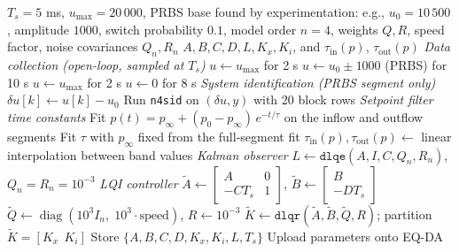 \documentclass[12pt,a4paper]{article}
\begin{document}
\begin{algorithm}[ht]
\caption{Prior to implementation (offline) using open-loop identification}\label{alg:offline}
\begin{algorithmic}[1]
\Require $T_s = 5$ ms, $u_{\max} = 20\,000$, PRBS base found by experimentation: e.g., $u_0 = 10\,500$,
         amplitude $1000$, switch probability $0.1$, model order $n = 4$,
         weights $Q, R$, speed factor, noise covariances $Q_n, R_n$
\Ensure $A, B, C, D, L, K_x, K_i$, and $\tau_{\text{in}}(p)$, $\tau_{\text{out}}(p)$
  \Statex \textit{Data collection (open-loop, sampled at $T_s$)}
  \State $u \gets u_{\max}$ for 2 s 
  \State $u \gets u_0 \pm 1000$ (PRBS) for 10 s 
  \State $u \gets u_{\max}$ for 2 s 
  \State $u \gets 0$ for 8 s 
  \Statex \textit{System identification (PRBS segment only)}
  \State $\delta u[k] \gets u[k] - u_0$
  \State Run \texttt{n4sid} on $(\delta u, y)$ with 20 block rows
  \Statex \textit{Setpoint filter time constants}
  \State Fit $p(t) = p_\infty + (p_0 - p_\infty)\,e^{-t/\tau}$ on the inflow
         and outflow segments
    \State Fit $\tau$ with $p_\infty$ fixed from the full-segment fit
  \EndFor
  \State $\tau_{\text{in}}(p), \tau_{\text{out}}(p) \gets$ linear interpolation
         between band values
  \Statex \textit{Kalman observer}
  \State $L \gets \texttt{dlqe}(A, I, C, Q_n, R_n)$, \quad $Q_n = R_n = 10^{-3}$
  \Statex \textit{LQI controller}
  \State $\tilde{A} \gets \begin{bmatrix} A & 0 \\ -C T_s & 1 \end{bmatrix}$,
         \quad $\tilde{B} \gets \begin{bmatrix} B \\ -D T_s \end{bmatrix}$
  \State $\tilde{Q} \gets \operatorname{diag}(10^{3} I_n,\; 10^{3}\cdot\text{speed})$, \quad $R \gets 10^{-3}$
  \State $\tilde{K} \gets \texttt{dlqr}(\tilde{A}, \tilde{B}, \tilde{Q}, R)$;
         \quad partition $\tilde{K} = [K_x \;\, K_i]$
  \State Store $\{A, B, C, D, K_x, K_i, L, T_s\}$
  \State Upload parameters onto EQ-DA
\EndProcedure
\end{algorithmic}
\end{algorithm}
\end{document}

